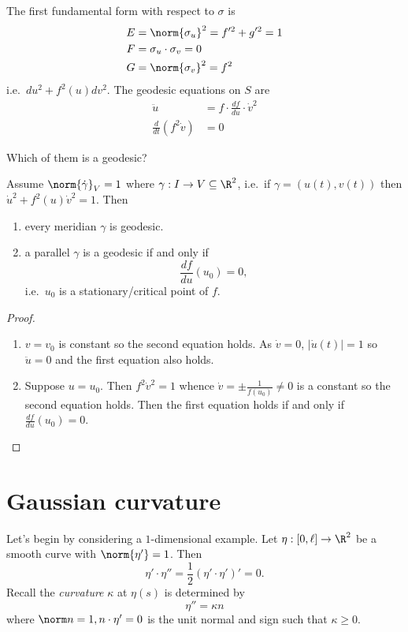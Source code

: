 \documentclass[a4paper]{article}
\theoremstyle{definition}
\begin{document}
The first fundamental form with respect to \(\sigma\) is
\begin{align*}
  E &= \norm{\sigma_u}^2 = f'^2 + g'^2 = 1 \\
  F &= \sigma_u \cdot \sigma_v = 0 \\
  G &= \norm{\sigma_v}^2 = f^2
\end{align*}
i.e.\ \(du^2 + f^2(u) dv^2\). The geodesic equations on \(S\) are
\begin{align*}
  \ddot u &= f \cdot \frac{df}{du} \cdot \dot v^2 \\
  \frac{d}{dt} (f^2 \dot v) &= 0
\end{align*}

Which of them is a geodesic?

\begin{proposition}
  Assume \(\norm{\dot \gamma}_V = 1\) where \(\gamma: I \to V \subseteq \R^2\), i.e.\ if \(\gamma = (u(t), v(t))\) then \(\dot u^2 + f^2(u)\dot v^2 = 1\). Then
  \begin{enumerate}
  \item every meridian \(\gamma\) is geodesic.
  \item a parallel \(\gamma\) is a geodesic if and only if
    \[
      \frac{df}{du}(u_0) = 0,
    \]
    i.e.\ \(u_0\) is a stationary/critical point of \(f\).
  \end{enumerate}
\end{proposition}

\begin{proof}\leavevmode
  \begin{enumerate}
  \item \(v = v_0 \) is constant so the second equation holds. As \(\dot v = 0\), \(|\dot u(t)| = 1\) so \(\ddot u = 0\) and the first equation also holds.
  \item Suppose \(u = u_0\). Then \(f^2 \dot v^2 = 1\) whence \(\dot v = \pm \frac{1}{f(u_0)} \neq 0\) is a constant so the second equation holds. Then the first equation holds if and only if \(\frac{df}{du} (u_0) = 0\).
  \end{enumerate}
\end{proof}

\section{Gaussian curvature}

Let's begin by considering a \(1\)-dimensional example. Let \(\eta: [0, \ell] \to \R^2\) be a smooth curve with \(\norm{\eta'} = 1\). Then
\[
  \eta' \cdot \eta'' = \frac{1}{2} (\eta' \cdot \eta')' = 0.
\]
Recall the \emph{curvature} \(\kappa\) at \(\eta(s)\) is determined by
\[
  \eta'' = \kappa n
\]
where \(\norm n = 1, n \cdot \eta' = 0\) is the unit normal and sign such that \(\kappa \geq 0\).
\end{document}
